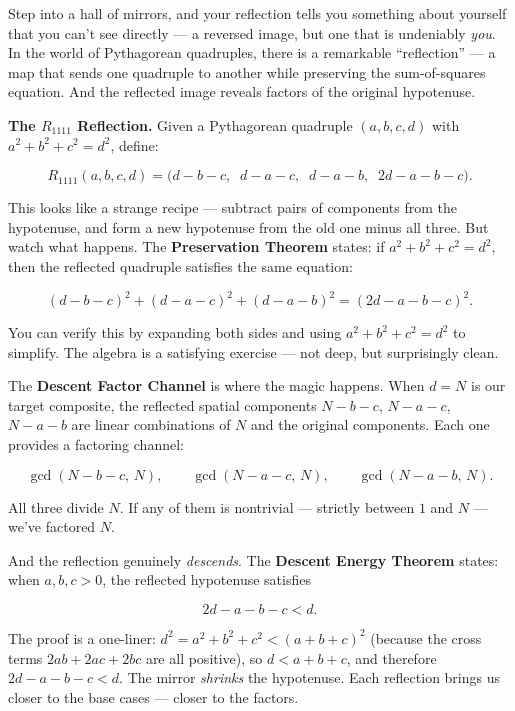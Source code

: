 Step into a hall of mirrors, and your reflection tells you something about yourself that you can't see directly --- a reversed image, but one that is undeniably \emph{you}. In the world of Pythagorean quadruples, there is a remarkable ``reflection'' --- a map that sends one quadruple to another while preserving the sum-of-squares equation. And the reflected image reveals factors of the original hypotenuse.

\textbf{The \(R_{1111}\) Reflection.} Given a Pythagorean quadruple \((a, b, c, d)\) with \(a^2 + b^2 + c^2 = d^2\), define:

\[R_{1111}(a, b, c, d) = \big(d - b - c,\;\; d - a - c,\;\; d - a - b,\;\; 2d - a - b - c\big).\]

This looks like a strange recipe --- subtract pairs of components from the hypotenuse, and form a new hypotenuse from the old one minus all three. But watch what happens. The \textbf{Preservation Theorem} states: if \(a^2 + b^2 + c^2 = d^2\), then the reflected quadruple satisfies the same equation:

\[(d - b - c)^2 + (d - a - c)^2 + (d - a - b)^2 = (2d - a - b - c)^2.\]

You can verify this by expanding both sides and using \(a^2 + b^2 + c^2 = d^2\) to simplify. The algebra is a satisfying exercise --- not deep, but surprisingly clean.

The \textbf{Descent Factor Channel} is where the magic happens. When \(d = N\) is our target composite, the reflected spatial components \(N - b - c\), \(N - a - c\), \(N - a - b\) are linear combinations of \(N\) and the original components. Each one provides a factoring channel:

\[\gcd(N - b - c, \, N), \qquad \gcd(N - a - c, \, N), \qquad \gcd(N - a - b, \, N).\]

All three divide \(N\). If any of them is nontrivial --- strictly between \(1\) and \(N\) --- we've factored \(N\).

And the reflection genuinely \emph{descends}. The \textbf{Descent Energy Theorem} states: when \(a, b, c > 0\), the reflected hypotenuse satisfies

\[2d - a - b - c < d.\]

The proof is a one-liner: \(d^2 = a^2 + b^2 + c^2 < (a + b + c)^2\) (because the cross terms \(2ab + 2ac + 2bc\) are all positive), so \(d < a + b + c\), and therefore \(2d - a - b - c < d\). The mirror \emph{shrinks} the hypotenuse. Each reflection brings us closer to the base cases --- closer to the factors.


